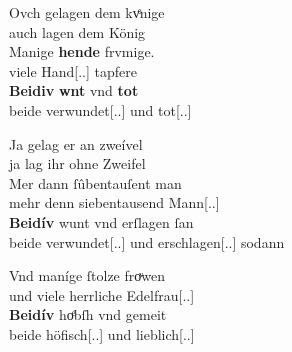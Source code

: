 \begin{exe}
\begin{xlist}
	\ex \label{ex:konjadjvvbeidiu_4} %
		\gll Ovch gelagen dem kvͤnige \\
			auch lagen dem König \\
	\sn \gll Manige \textbf{hende} frvmige. \\
			viele Hand[\Nom.\Pl.\F\subM] tapfere \\
	\sn \gll \textbf{Beidiv} \textbf{wnt} vnd \textbf{tot} \\
			beide verwundet[\Nom.\Pl.\F\subM] und
			tot[\Nom.\Pl.\F\subM] \\
		\begin{taggedline}{\parencites[\pno~150\ra, 20--22]{kc:VB}[vgl.][15880--15882]{schroeder1895}}
		\trans {}
		\end{taggedline}

	\ex \label{ex:konjadjvvbeidiu_5} %
		\gll Ja gelag er an zweível \\
			ja lag ihr ohne Zweifel \\
	\sn \gll Mer dann ſûbentauſent man \\
			mehr denn siebentausend Mann[\Nom.\Pl.\MascM] \\
	\sn \gll \textbf{Beidív} wunt vnd erſlagen ſan \\
			beide verwundet[\Nom.\Pl.\MascM] und
			erschlagen[\Nom.\Pl.\MascM] sodann \\
		\begin{taggedline}{\parencites[\pno~45\va, 46--48]{kc:B1}[vgl.][16891--16893]{schroeder1895}}
		\trans {}
		\end{taggedline}

	\ex \label{ex:konjadjvvbeidiu_6} %
		\gll Vnd maníge ſtolze froͮwen \\
			und viele herrliche Edelfrau[\Nom.\Pl.\FemF] \\
	\sn \gll \textbf{Beidív} hoͤbſh vnd gemeit \\
			beide höfisch[\Nom.\Pl.\FemF] und lieblich[\Nom.\Pl.\FemF] \\
		\begin{taggedline}{\parencites[\pno~21\va, 21--22]{kc:VB}[zu][4351--4352]{schroeder1895}}
		\trans {}
		\end{taggedline}
	\end{xlist}
\end{exe}

